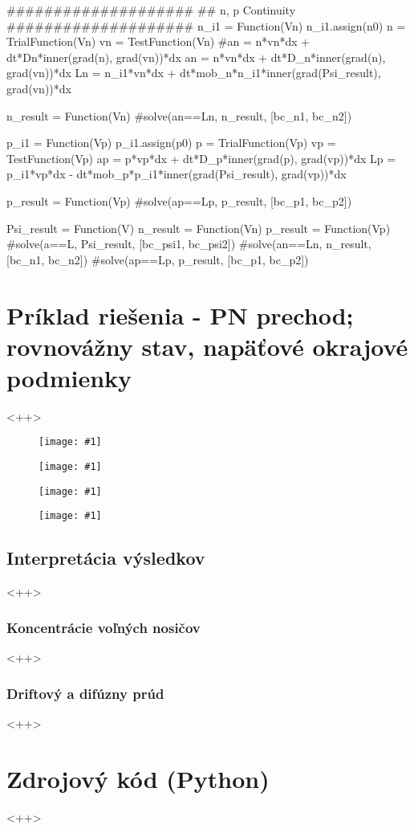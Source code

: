 \documentclass[a4paper, twoside, 12pt, onecolumn]{article}
\newcommand{\myfig}[3]
{
    \begin{figure}[!ht]
	\centering
	\texttt{[image: \#1]}
	\caption{#2}
	#3
    \end{figure}
}
\newcommand{\myfigscaled}[4]
{
    \begin{figure}[!ht]
	\centering
	\texttt{[image: \#1]}
	\caption{#3}
	#4
    \end{figure}
}
\begin{document}
\begin{mycode1}
####################
## n, p Continuity
####################
n_i1 = Function(Vn)
n_i1.assign(n0)
n = TrialFunction(Vn)
vn = TestFunction(Vn)
#an = n*vn*dx + dt*Dn*inner(grad(n), grad(vn))*dx
an = n*vn*dx + dt*D_n*inner(grad(n), grad(vn))*dx
Ln = n_i1*vn*dx + dt*mob_n*n_i1*inner(grad(Psi_result), grad(vn))*dx

n_result = Function(Vn)
#solve(an==Ln, n_result, [bc_n1, bc_n2])

p_i1 = Function(Vp)
p_i1.assign(p0)
p = TrialFunction(Vp)
vp = TestFunction(Vp)
ap = p*vp*dx + dt*D_p*inner(grad(p), grad(vp))*dx
Lp = p_i1*vp*dx - dt*mob_p*p_i1*inner(grad(Psi_result), grad(vp))*dx

p_result = Function(Vp)
#solve(ap==Lp, p_result, [bc_p1, bc_p2])
\end{mycode1}

\begin{mycode1}
Psi_result = Function(V)
n_result = Function(Vn)
p_result = Function(Vp)
#solve(a==L, Psi_result, [bc_psi1, bc_psi2])
#solve(an==Ln, n_result, [bc_n1, bc_n2])
#solve(ap==Lp, p_result, [bc_p1, bc_p2])
\end{mycode1}

\section{Príklad riešenia - PN prechod; rovnovážny stav, napäťové okrajové podmienky}<++>
\myfig{tmp1.eps}{}{}
\myfig{tmp2.eps}{}{}
\myfig{tmp3.eps}{}{}
\myfig{tmp4.eps}{}{}
\subsection{Interpretácia výsledkov}<++>
\subsubsection{Koncentrácie voľných nosičov}<++>
\subsubsection{Driftový a difúzny prúd}<++>



\nocite{fenicsbook}
\nocite{brenner_scott}
%



%
\appendix
\section{Zdrojový kód (Python)}<++>

%


\label{LastPage}
\end{document}
